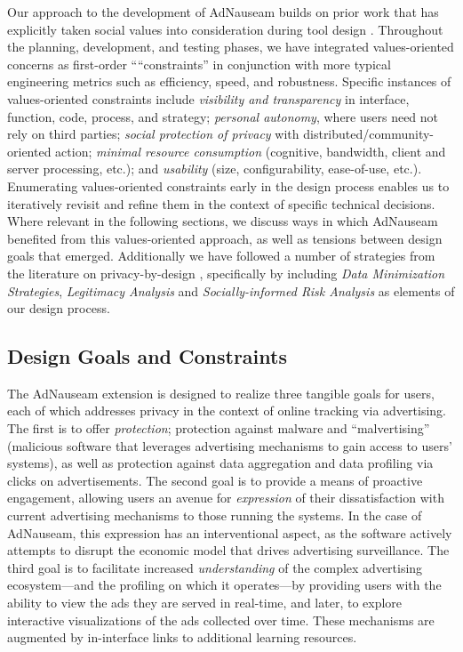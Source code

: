 \documentclass[conference]{IEEEtran}
\begin{document}
Our approach to the development of AdNauseam builds on prior work that has explicitly taken social values into consideration during tool design \cite{Friedman,Flanagan,Howe-1}. Throughout the planning, development, and testing phases, we have integrated values-oriented concerns as first-order ““constraints” in conjunction with more typical engineering metrics such as efficiency, speed, and robustness. Specific instances of values-oriented constraints include \emph{visibility and transparency} in interface, function, code, process, and strategy; \emph{personal autonomy}, where users need not rely on third parties; \emph{social protection of privacy} with distributed/community-oriented action; \emph{minimal resource consumption} (cognitive, bandwidth, client and server processing, etc.); and \emph{usability} (size, configurability, ease-of-use, etc.). Enumerating values-oriented constraints early in the design process enables us to iteratively revisit and refine them in the context of specific technical decisions. Where relevant in the following sections, we discuss ways in which AdNauseam benefited from this values-oriented approach, as well as tensions between design goals that emerged. Additionally we have followed a number of strategies from the literature on privacy-by-design \cite{Gurses-0, Hoepman, Gurses-1}, specifically by including \emph{Data Minimization Strategies}, \emph{Legitimacy Analysis} and \emph{Socially-informed Risk Analysis} as elements of our design process.

\subsection{Design Goals and Constraints}

The AdNauseam extension is designed to realize three tangible goals for users, each of which addresses privacy in the context of online tracking via advertising. The first is to offer \emph{protection}; protection against malware and “malvertising” (malicious software that leverages advertising mechanisms to gain access to users' systems\cite{Mansfield}), as well as protection against data aggregation and data profiling via clicks on advertisements. The second goal is to provide a means of proactive engagement, allowing users an avenue for \emph{expression} of their dissatisfaction with current advertising mechanisms to those running the systems. In the case of AdNauseam, this expression has an interventional aspect, as the software actively attempts to disrupt the economic model that drives advertising surveillance. The third goal is to facilitate increased \emph{understanding} of the complex advertising ecosystem---and the profiling on which it operates---by providing users with the ability to view the ads they are served in real-time, and later, to explore interactive visualizations of the ads collected over time. These mechanisms are augmented by in-interface links to additional learning resources.
\end{document}
